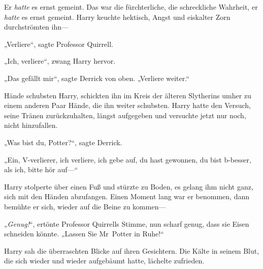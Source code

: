 Er \emph{hatte} es ernst gemeint. Das war die fürchterliche, die schreckliche Wahrheit, er \emph{hatte} es ernst gemeint. Harry keuchte hektisch, Angst und eiskalter Zorn durchströmten ihn—

„Verliere“, sagte Professor Quirrell.

„Ich, verliere“, zwang Harry hervor.

„Das gefällt mir“, sagte Derrick von oben. „Verliere weiter.“

\later

Hände schubsten Harry, schickten ihn im Kreis der älteren Slytherins umher zu einem anderen Paar Hände, die ihn weiter schubsten. Harry hatte den Versuch, seine Tränen zurückzuhalten, längst aufgegeben und versuchte jetzt nur noch, nicht hinzufallen.

„Was bist du, Potter?“, sagte Derrick.

„Ein, V-verlierer, ich verliere, ich gebe auf, du hast gewonnen, du bist b-besser, als ich, bitte hör auf—“

Harry stolperte über einen Fuß und stürzte zu Boden, es gelang ihm nicht ganz, sich mit den Händen abzufangen. Einen Moment lang war er benommen, dann bemühte er sich, wieder auf die Beine zu kommen—

„\emph{Genug!}“, ertönte Professor Quirrells Stimme, nun scharf genug, dass sie Eisen schneiden könnte. „Lassen Sie Mr~Potter in Ruhe!“

Harry sah die überraschten Blicke auf ihren Gesichtern. Die Kälte in seinem Blut, die sich wieder und wieder aufgebäumt hatte, lächelte zufrieden.

